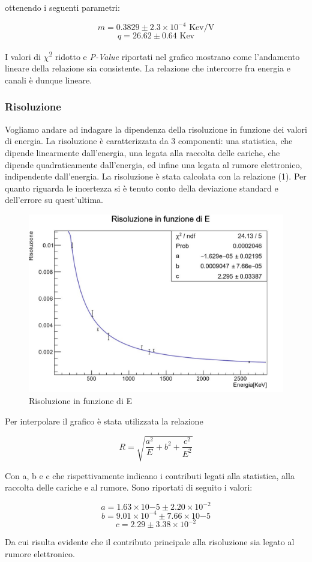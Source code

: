 \documentclass[a4paper,10pt]{article}
\newcommand*{\unit}[1]{\ensuremath{\mathrm{\,#1}}}
\begin{document}
ottenendo i seguenti parametri:

$$
	m=0.3829 \pm 2.3 \times 10^{-4}\, \unit{Kev/V}
$$
$$
	q=26.62 \pm 0.64\, \unit{Kev}
$$

I valori di $\chi$\textsuperscript{2} ridotto e \textit{P-Value} riportati nel grafico mostrano come l'andamento lineare della relazione sia consistente. La relazione che intercorre fra energia e canali è dunque lineare.

\subsubsection{Risoluzione}
Vogliamo andare ad indagare la dipendenza della risoluzione in funzione dei valori di energia. La risoluzione è caratterizzata da 3 componenti: una statistica, che dipende linearmente dall'energia, una legata alla raccolta delle cariche, che dipende quadraticamente dall'energia, ed infine una legata al rumore elettronico, indipendente dall'energia. La risoluzione è stata calcolata con la relazione (1). Per quanto riguarda le incertezza si è tenuto conto della deviazione standard e dell'errore su quest'ultima. 

\begin{figure}[H]
    \centering
    \includegraphics[scale=0.45]{grafici/risoluzionesources}
    \caption{Risoluzione in funzione di E}
\end{figure}

Per interpolare il grafico è stata utilizzata la relazione

\begin{equation}
	R=\sqrt{\frac{a^2}{E}+b^2+\frac{c^2}{E^2}}
\end{equation}

Con a, b e c che rispettivamente indicano i contributi legati alla statistica, alla raccolta delle cariche e al rumore. Sono riportati di seguito i valori:

$$
	a=1.63 \times 10{-5} \pm 2.20 \times 10^{-2}
$$
$$
	b=9.01 \times 10^{-4} \pm 7.66 \times 10{-5}
$$
$$
	c= 2.29 \pm 3.38 \times 10^{-2}
$$

Da cui risulta evidente che il contributo principale alla risoluzione sia legato al rumore elettronico.
\end{document}

